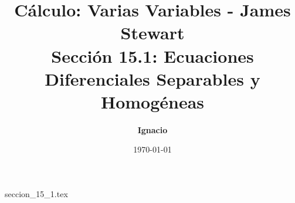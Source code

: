 \documentclass[11pt,spanish,oneside]{report}
\title{\textbf{Cálculo: Varias Variables - James Stewart} \\ \Large Sección 15.1: Ecuaciones Diferenciales Separables y Homogéneas}
\author{\textbf{Ignacio}}
\date{\today}
\begin{document}
\maketitle

{seccion_15_1.tex}
\end{document}
